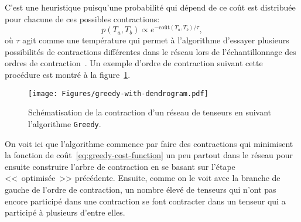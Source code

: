 C'est une heuristique puisqu'une probabilité qui dépend de ce coût est distribuée pour chacune de ces possibles contractions:
\begin{equation}
    p(T_a, T_b) \propto e^{-\mathrm{coût}(T_a, T_b)/\tau},
\end{equation}
où $\tau$ agit comme une température qui permet à l'algorithme d'essayer plusieurs possibilités de contractions différentes dans le réseau lors de l'échantillonnage des ordres de contraction~\cite{gray_hyper-optimized_2021}.
Un exemple d'ordre de contraction suivant cette procédure est montré à la figure~\ref{fig:greedy-with-dendrogram}.
\begin{figure}[h]
    \centering
    \texttt{[image: Figures/greedy-with-dendrogram.pdf]}
    \caption[Schématisation de la contraction d'un réseau de tenseurs (\texttt{Greedy}).]{Schématisation de la contraction d'un réseau de tenseurs en suivant l'algorithme \texttt{Greedy}.}
    \label{fig:greedy-with-dendrogram}
\end{figure}
On voit ici que l'algorithme commence par faire des contractions qui minimisent la fonction de coût~\ref{eq:greedy-cost-function} un peu partout dans le réseau pour ensuite construire l'arbre de contraction en se basant sur l'étape <<~optimisée~>> précédente.
Ensuite, comme on le voit avec la branche de gauche de l'ordre de contraction, un nombre élevé de tenseurs qui n'ont pas encore participé dans une contraction se font contracter dans un tenseur qui a participé à plusieurs d'entre elles.

